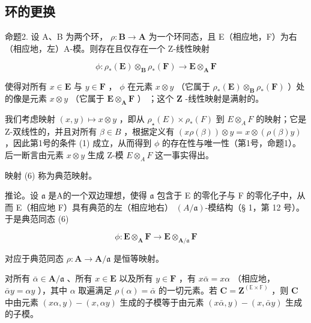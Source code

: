 \subsection{环的更换}

命题2. 设 A、B 为两个环， \(\rho: \mathbf{B} \to \mathbf{A}\) 为一个环同态，且 E（相应地，F）为右（相应地，左）A-模。则存在且仅存在一个 Z-线性映射

\[
\phi : \rho_ {*} (\mathbf {E}) \otimes_ {\mathbf {B}} \rho_ {*} (\mathbf {F}) \rightarrow \mathbf {E} \otimes_ {\mathbf {A}} \mathbf {F}\tag{6}
\]

使得对所有 \(x \in \mathbf{E}\) 与 \(y \in \mathbf{F}\) ， \(\phi\) 在元素 \(x \otimes y\) （它属于 \(\rho_{*}(\mathbf{E}) \otimes_{\mathbf{B}} \rho_{*}(\mathbf{F})\) ）处的像是元素 \(x \otimes y\) （它属于 \(\mathbf{E} \otimes_{\mathbf{A}} \mathbf{F}\) ） ；这个 \(\mathbf{Z}\) -线性映射是满射的。

我们考虑映射 \((x,y)\mapsto x\otimes y\) ，即从 \(\rho_{\star}(E)\times \rho_{*}(F)\) 到 \(E\otimes_A F\) 的映射；它是 Z-双线性的，并且对所有 \(\beta \in B\) ，根据定义有 \((x\rho (\beta))\otimes y = x\otimes (\rho (\beta)y)\) ，因此第1号的条件 (1) 成立，从而得到 \(\phi\) 的存在性与唯一性（第1号，命题1）。后一断言由元素 \(x\otimes y\) 生成 Z-模 \(E\otimes_A F\) 这一事实得出。

映射 (6) 称为典范映射。

推论。设 \(\mathfrak{a}\) 是A的一个双边理想，使得 \(\mathfrak{a}\) 包含于 E 的零化子与 F 的零化子中，从而 E（相应地 F）具有典范的左（相应地右） \((A/\mathfrak{a})\)-模结构（§ 1，第 12 号）。于是典范同态 (6)

\[
\phi : \mathbf {E} \otimes_ {\mathbf {A}} \mathbf {F} \rightarrow \mathbf {E} \otimes_ {\mathbf {A} / \mathfrak {a}} \mathbf {F}
\]

对应于典范同态 \(\rho: \mathbf{A} \to \mathbf{A} / \mathfrak{a}\) 是恒等映射。

对所有 \(\bar{\alpha} \in \mathbf{A} / \mathfrak{a}\) 、所有 \(x \in \mathbf{E}\) 以及所有 \(y \in \mathbf{F}\) ，有 \(x\bar{\alpha} = x\alpha\) （相应地， \(\bar{\alpha}y = \alpha y\) ），其中 \(\alpha\) 取遍满足 \(\rho(\alpha) = \bar{\alpha}\) 的一切元素。若 \(\mathbf{C} = \mathbf{Z}^{(\mathbb{E} \times \mathbb{F})}\) ，则 \(\mathbf{C}\) 中由元素 \((x\alpha, y) - (x, \alpha y)\) 生成的子模等于由元素 \((x\bar{\alpha}, y) - (x, \bar{\alpha}y)\) 生成的子模。

